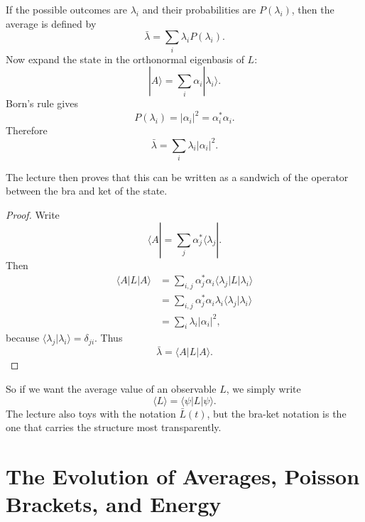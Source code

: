 If the possible outcomes are \(\lambda_i\) and their probabilities are \(P(\lambda_i)\), then the average is defined by
\begin{equation}
\bar{\lambda}=\sum_i \lambda_i P(\lambda_i).
\end{equation}
Now expand the state in the orthonormal eigenbasis of \(L\):
\begin{equation}
|A\rangle=\sum_i \alpha_i |\lambda_i\rangle.
\end{equation}
Born's rule gives
\begin{equation}
P(\lambda_i)=|\alpha_i|^2=\alpha_i^*\alpha_i.
\end{equation}
Therefore
\begin{equation}
\bar{\lambda}=\sum_i \lambda_i |\alpha_i|^2.
\end{equation}

The lecture then proves that this can be written as a sandwich of the operator between the bra and ket of the state.

\begin{proof}
Write
\begin{equation}
\langle A|=\sum_j \alpha_j^* \langle \lambda_j|.
\end{equation}
Then
\begin{align}
\langle A|L|A\rangle
&=
\sum_{i,j}\alpha_j^*\alpha_i \langle \lambda_j|L|\lambda_i\rangle \\
&=
\sum_{i,j}\alpha_j^*\alpha_i \lambda_i \langle \lambda_j|\lambda_i\rangle \\
&=
\sum_i \lambda_i |\alpha_i|^2,
\end{align}
because \(\langle \lambda_j|\lambda_i\rangle=\delta_{ji}\). Thus
\begin{equation}
\bar{\lambda}=\langle A|L|A\rangle.
\end{equation}
\end{proof}

So if we want the average value of an observable \(L\), we simply write
\begin{equation}
\langle L\rangle=\langle \psi|L|\psi\rangle.
\end{equation}
The lecture also toys with the notation \(\bar L(t)\), but the bra-ket notation is the one that carries the structure most transparently.

\section{The Evolution of Averages, Poisson Brackets, and Energy}

